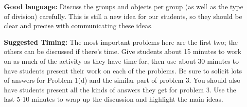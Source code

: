 \documentclass{ximera}
\begin{document}
\begin{instructorNotes}
{\bf Good language:} Discuss the groups and objects per group (as well as the type of division) carefully. This is still a new idea for our students, so they should be clear and precise with communicating these ideas.

{\bf Suggested Timing:} The most important problems here are the first two; the others can be discussed if there's time. Give students about 15 minutes to work on as much of the activity as they have time for, then use about 30 minutes to have students present their work on each of the problems. Be sure to solicit lots of answers for Problem 1(d) and the similar part of problem 3. You should also have students present all the kinds of answers they get for problem 3. Use the last 5-10 minutes to wrap up the discussion and highlight the main ideas.
\end{instructorNotes}
\end{document}
